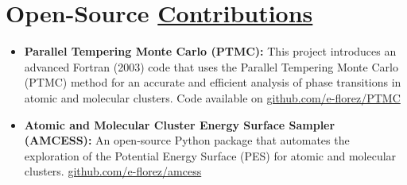 \section{Open-Source \href{.}{Contributions}}

\begin{itemize}
    \small
    \item \textbf{Parallel Tempering Monte Carlo (PTMC):}
          This project introduces an advanced Fortran (2003) code that uses the Parallel Tempering Monte Carlo (PTMC) method for an accurate and efficient analysis of phase transitions in atomic and molecular clusters. Code available on \href{https://github.com/e-florez/PTMC}{github.com/e-florez/PTMC}

    \item \textbf{Atomic and Molecular Cluster Energy Surface Sampler (AMCESS):}
          An open-source Python package that automates the exploration of the Potential Energy Surface (PES) for atomic and molecular clusters. %
          \href{https://github.com/e-florez/amcess}{github.com/e-florez/amcess}


\end{itemize}
